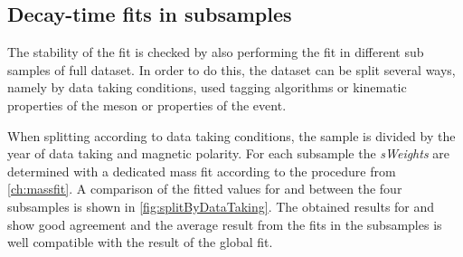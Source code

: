 \subsection{Decay-time fits in subsamples}
\label{sec:valOnSubSample}

The stability of the fit is checked by also performing the fit in different sub samples of full dataset.
In order to do this, the dataset can be split several ways, namely by data taking conditions, used tagging algorithms or kinematic properties of the \Bz meson or properties of the event.

When splitting according to data taking conditions, the \BdToDpi sample is divided by the year of data taking and magnetic polarity.
For each subsample the \emph{sWeights} are determined with a dedicated mass fit according to the procedure from \cref{ch:massfit}.
A comparison of the fitted values for \Sf and \Sfbar between the four subsamples is shown in \cref{fig:splitByDataTaking}.
The obtained results for \Sf and \Sfbar show good agreement and the average result from the fits in the subsamples is well compatible with the result of the global fit.
